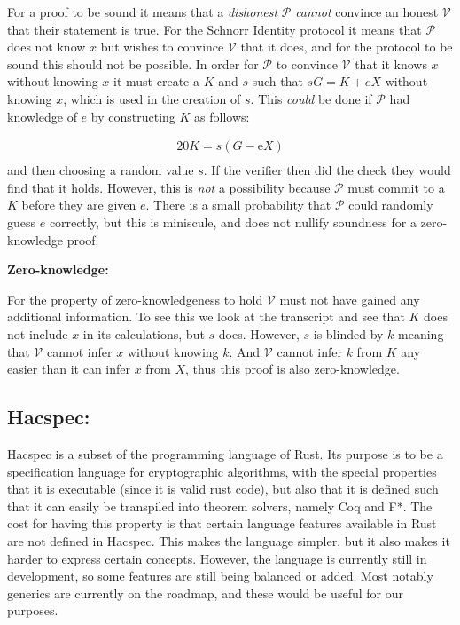 \documentclass{article}
\newcommand{\eq}[1]{\begin{alignat*}{20}#1\end{alignat*}}
\newcommand{\ran}[1]{\mathrm{#1}}
\newcommand{\V}{\mathcal{V}}
\renewcommand{\P}{\mathcal{P}}
\begin{document}
For a proof to be sound it means that a \textit{dishonest} $\P$
\textit{cannot} convince an honest $\V$ that their statement is
true. For the Schnorr Identity protocol it means that $\P$ does not know
$x$ but wishes to convince $\V$ that it does, and for the protocol to
be sound this should not be possible. In order for $\P$ to convince
$\V$ that it knows $x$ without knowing $x$ it must create a $K$ and
$s$ such that $sG = K + eX$ without knowing $x$, which is used in the
creation of $s$. This \textit{could} be done if $\P$ had knowledge of
$e$ by constructing $K$ as follows:

\eq{
	K = s(G - \ran{e}X) \\
}
and then choosing a random value $s$. If the verifier then did the
check they would find that it holds. However, this is \textit{not}
a possibility because $\P$ must commit to a $K$ before they are given
$e$. There is a small probability that $\P$ could randomly guess $e$
correctly, but this is miniscule, and does not nullify soundness for
a zero-knowledge proof.

\textbf{Zero-knowledge:}

For the property of zero-knowledgeness to hold $\V$ must not have gained
any additional information. To see this we look at the transcript
and see that $K$ does not include $x$ in its calculations, but $s$
does. However, $s$ is blinded by $k$ meaning that $\V$ cannot infer
$x$ without knowing $k$. And $\V$ cannot infer $k$ from $K$ any easier
than it can infer $x$ from $X$, thus this proof is also zero-knowledge.

\newpage

\subsection{Hacspec:} \label{hacspec}

Hacspec is a subset of the programming language of Rust. Its purpose is
to be a specification language for cryptographic algorithms, with the
special properties that it is executable (since it is valid rust code),
but also that it is defined such that it can easily be transpiled into
theorem solvers, namely Coq and F*. The cost for having this property
is that certain language features available in Rust are not
defined in Hacspec. This makes the language simpler, but it also makes
it harder to express certain concepts. However, the language is 
currently still in development, so some features are still being 
balanced or added. Most notably generics are currently on the roadmap, 
and these would be useful for our purposes.
\end{document}
